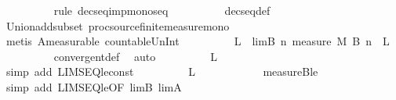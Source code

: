 \begin{isabellebody}
\ \ \ \ \ \ \ \ \isamarkupfalse%
\ {\isacharparenleft}{\kern0pt}rule\ decseq{\isacharunderscore}{\kern0pt}imp{\isacharunderscore}{\kern0pt}monoseq{\isacharparenright}{\kern0pt}\isanewline
\ \ \ \ \ \ \ \ \isamarkupfalse%
\ decseq{\isacharunderscore}{\kern0pt}def\isanewline
\ \ \ \ \ \ \ \ \isamarkupfalse%
\ Union{\isacharunderscore}{\kern0pt}add{\isacharunderscore}{\kern0pt}subset\ proc{\isacharunderscore}{\kern0pt}source{\isachardot}{\kern0pt}finite{\isacharunderscore}{\kern0pt}measure{\isacharunderscore}{\kern0pt}mono\isanewline
\ \ \ \ \ \ \ \ \isamarkupfalse%
\ {\isacharparenleft}{\kern0pt}metis\ A{\isacharunderscore}{\kern0pt}measurable\ countable{\isacharunderscore}{\kern0pt}Un{\isacharunderscore}{\kern0pt}Int{\isacharparenleft}{\kern0pt}{}{\isacharparenright}{\kern0pt}{\isacharparenright}{\kern0pt}\isanewline
\ \ \ \ \ \ \isamarkupfalse%
\ \isamarkupfalse%
\ L\ \ lim{\isacharunderscore}{\kern0pt}B{\isacharcolon}{\kern0pt}\ {\isachardoublequoteopen}{\isacharparenleft}{\kern0pt}{\isasymlambda}n{\isachardot}{\kern0pt}\ measure\ {\isacharquery}{\kern0pt}M\ {\isacharparenleft}{\kern0pt}{\isacharquery}{\kern0pt}B\ n{\isacharparenright}{\kern0pt}{\isacharparenright}{\kern0pt}\ {\isasymlonglonglongrightarrow}\ L{\isachardoublequoteclose}\isanewline
\ \ \ \ \ \ \ \ \isamarkupfalse%
\ convergent{\isacharunderscore}{\kern0pt}def\ \isamarkupfalse%
\ auto\isanewline
\ \ \ \ \ \ \isamarkupfalse%
\ \isamarkupfalse%
\ {\isachardoublequoteopen}L\ {\isasymge}\ {}{\isachardoublequoteclose}\isanewline
\ \ \ \ \ \ \ \ \isamarkupfalse%
\ {\isacharparenleft}{\kern0pt}simp\ add{\isacharcolon}{\kern0pt}\ LIMSEQ{\isacharunderscore}{\kern0pt}le{\isacharunderscore}{\kern0pt}const{\isacharparenright}{\kern0pt}\isanewline
\ \ \ \ \ \ \isamarkupfalse%
\ \isamarkupfalse%
\ {\isachardoublequoteopen}L\ {\isasymle}\ {}{\isachardoublequoteclose}\isanewline
\ \ \ \ \ \ \ \ \isamarkupfalse%
\ measure{\isacharunderscore}{\kern0pt}B{\isacharunderscore}{\kern0pt}le\ \isamarkupfalse%
\ {\isacharparenleft}{\kern0pt}simp\ add{\isacharcolon}{\kern0pt}\ LIMSEQ{\isacharunderscore}{\kern0pt}le{\isacharbrackleft}{\kern0pt}OF\ lim{\isacharunderscore}{\kern0pt}B\ lim{\isacharunderscore}{\kern0pt}A{\isacharbrackright}{\kern0pt}{\isacharparenright}{\kern0pt}\isanewline
\ \ \ \ \ \ \isamarkupfalse%

\end{isabellebody}
